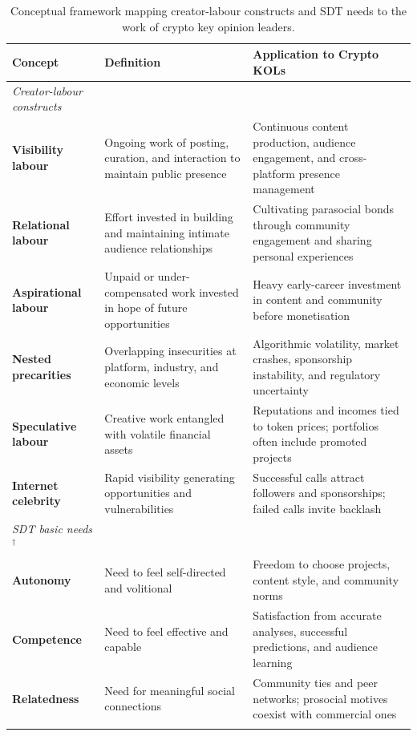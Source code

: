 \begin{table}[htbp]
\centering
\caption{Conceptual framework mapping creator-labour constructs and SDT needs to the work of crypto key opinion leaders.}
\label{tab:concepts-kols}
\small
\renewcommand{\arraystretch}{1.2}
\begin{tabular}{@{} >{\raggedright\arraybackslash}p{3.5cm} >{\raggedright\arraybackslash}p{6.2cm} >{\raggedright\arraybackslash}p{6.2cm} @{}}
\toprule
\textbf{Concept} & \textbf{Definition} & \textbf{Application to Crypto KOLs} \\
\midrule
\textit{Creator-labour constructs} & & \\[-4pt]
\cmidrule(r){1-1}
\textbf{Visibility labour} {\cite{AbidinVisibility2016}} & Ongoing work of posting, curation, and interaction to maintain public presence & Continuous content production, audience engagement, and cross-platform presence management \\[6pt]
\textbf{Relational labour} {\cite{BaymPlaying2018}} & Effort invested in building and maintaining intimate audience relationships & Cultivating parasocial bonds through community engagement and sharing personal experiences \\[6pt]
\textbf{Aspirational labour} {\cite{DuffyAspirationalWork2017}} & Unpaid or under-compensated work invested in hope of future opportunities & Heavy early-career investment in content and community before monetisation \\[6pt]
\textbf{Nested precarities} {\cite{DuffyNestedPrecarities2021}} & Overlapping insecurities at platform, industry, and economic levels & Algorithmic volatility, market crashes, sponsorship instability, and regulatory uncertainty \\[6pt]
\textbf{Speculative labour} {\cite{AlacovskaSpeculativeLabour2024}} & Creative work entangled with volatile financial assets & Reputations and incomes tied to token prices; portfolios often include promoted projects \\[6pt]
\textbf{Internet celebrity} {\cite{AbidinInternetCelebrity2018}} & Rapid visibility generating opportunities and vulnerabilities & Successful calls attract followers and sponsorships; failed calls invite backlash \\[3pt]
\addlinespace[4pt]
\textit{SDT basic needs}$^{\dagger}$ & & \\[-4pt]
\cmidrule(r){1-1}
\textbf{Autonomy} & Need to feel self-directed and volitional & Freedom to choose projects, content style, and community norms \\[6pt]
\textbf{Competence} & Need to feel effective and capable & Satisfaction from accurate analyses, successful predictions, and audience learning \\[6pt]
\textbf{Relatedness} & Need for meaningful social connections & Community ties and peer networks; prosocial motives coexist with commercial ones \\
\bottomrule
\addlinespace[2pt]
\multicolumn{3}{@{}l}{\footnotesize$^{\dagger}$\,All three needs drawn from the self-determination theory~\cite{DeciRyan1985,RyanDeci2000}.}
\end{tabular}
\end{table}

